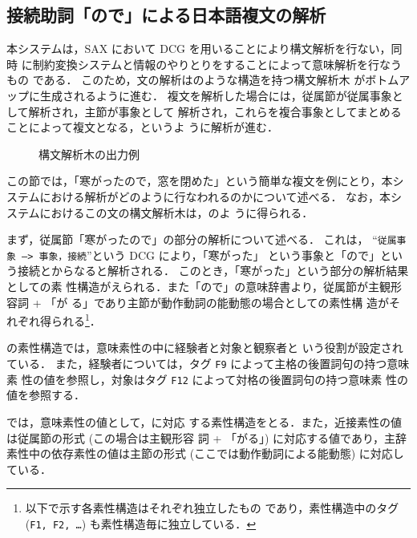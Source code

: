 \subsection{接続助詞「ので」による日本語複文の解析} \label{節:日本語複文
の解析}

本システムは，SAX において DCG を用いることにより構文解析を行ない，同時
に制約変換システムと情報のやりとりをすることによって意味解析を行なうもの
である．
このため，文の解析はのような構造を持つ構文解析木
がボトムアップに生成されるように進む．
複文を解析した場合には，従属節が従属事象として解析され，主節が事象として
解析され，これらを複合事象としてまとめることによって複文となる，というよ
うに解析が進む．

\begin{figure}[htbp]

\begin{center}
\end{center}


\caption{構文解析木の出力例}
\end{figure}

この節では，「寒がったので，窓を閉めた」という簡単な複文を例にとり，本シ
ステムにおける解析がどのように行なわれるのかについて述べる．
なお，本システムにおけるこの文の構文解析木は，のよ
うに得られる．

まず，従属節「寒がったので」の部分の解析について述べる．
これは， ``{\tt 従属事象 --> 事象，接続}''という DCG により，「寒がった」
という事象と「ので」という接続とからなると解析される．
このとき，「寒がった」という部分の解析結果としての素
性構造がえられる．また「ので」の意味辞書より，従属節が主観形容詞 + 「が
る」であり主節が動作動詞の能動態の場合としての素性構
造がそれぞれ得られる\footnote{以下で示す各素性構造はそれぞれ独立したもの
であり，素性構造中のタグ ({\tt F1, F2, …}) も素性構造毎に独立している．}．

の素性構造では，意味素性の中に経験者と対象と観察者と
いう役割が設定されている．
また，経験者については，タグ {\tt F9} によって主格の後置詞句の持つ意味素
性の値を参照し，対象はタグ {\tt F12} によって対格の後置詞句の持つ意味素
性の値を参照する．

では，意味素性の値として，に対応
する素性構造をとる．また，近接素性の値は従属節の形式 (この場合は主観形容
詞 + 「がる」) に対応する値であり，主辞素性中の依存素性の値は主節の形式 
(ここでは動作動詞による能動態) に対応している．

